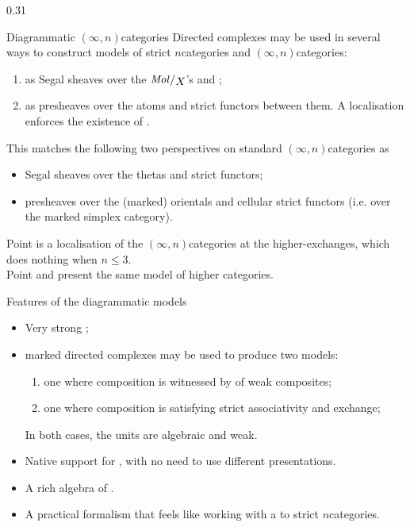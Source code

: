 \begin{columns}[t,totalwidth=\textwidth]
\begin{column}{0.31\textwidth}
\begin{block}{Diagrammatic \( (\infty, n) \)\nbd categories}
  Directed complexes may be used in several ways to construct models of strict \( n \)\nbd categories and \( (\infty, n) \)\nbd categories:
  \begin{enumerate}
    \item as Segal sheaves over the \( \molecin{X} \)'s and ; 
    \item as presheaves over the atoms and  strict functors between them.
    A localisation enforces the existence of .
  \end{enumerate}
  This matches the following two perspectives on standard \( (\infty, n) \)\nbd categories as
  \begin{itemize}
    \item Segal sheaves over the thetas and strict functors;
    \item presheaves over the (marked) orientals and cellular strict functors (i.e. over the marked simplex category).
  \end{itemize}
   Point  is a localisation of the \( (\infty, n) \)\nbd categories at the higher-exchanges, which does nothing when \( n \le 3 \). \\
   Point  and  present the same model of higher categories.
\end{block}

\begin{block} {Features of the diagrammatic models}
  \begin{itemize}
    \item Very strong ;
    \item {} marked directed complexes may be used to produce two  models:
    \begin{enumerate}
      \item one where composition is witnessed by  of weak composites;
      \item one where composition is  satisfying strict associativity and exchange; 
    \end{enumerate}
    In both cases, the units are algebraic and weak.  
    \item Native support for , with no need to use different presentations.
    \item A rich algebra of .
    \item A practical formalism that feels like working with a  to strict \( n \)\nbd categories.
  \end{itemize}
\end{block}


\end{column}
\end{columns}

